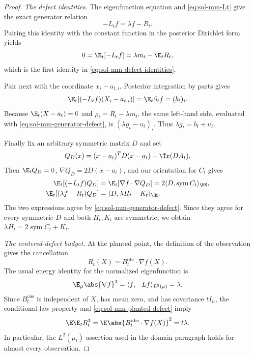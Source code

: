 \documentclass[../main.tex]{subfiles}
\begin{document}
\begin{proof}
\medskip
\noindent\emph{The defect identities.}
The eigenfunction equation and \eqref{eq:sol-mm-Lt} give the exact generator relation
\begin{equation}
  -L_tf=\lambda f-R_t.
  \label{eq:sol-mm-generator-defect}
\end{equation}
Pairing this identity with the constant function in the posterior Dirichlet form yields
\[
  0=\E_t[-L_tf]=\lambda m_t-\E_tR_t,
\]
which is the first identity in \eqref{eq:sol-mm-defect-identities}.

Pair next with the coordinate $x_i-a_{t,i}$.  Posterior integration by parts gives
\[
  \E_t[(-L_tf)(X_i-a_{t,i})]=\E_t\partial_i f=(b_t)_i.
\]
Because $\E_t(X-a_t)=0$ and $\rho_t=R_t-\lambda m_t$, the same left-hand side, evaluated with
\eqref{eq:sol-mm-generator-defect}, is $(\lambda g_t-u_t)_i$.  Thus
$\lambda g_t=b_t+u_t$.

Finally fix an arbitrary symmetric matrix $D$ and set
\[
  Q_D(x)=(x-a_t)^TD(x-a_t)-\Tr(DA_t).
\]
Then $\E_tQ_D=0$, $\nabla Q_D=2D(x-a_t)$, and our orientation for $C_t$ gives
\begin{align*}
  \E_t[(-L_tf)Q_D]
  &=\E_t[\nabla f\cdot\nabla Q_D]
    =2\langle D,\operatorname{sym}C_t\rangle_{\HS},\\
  \E_t[(\lambda f-R_t)Q_D]
  &=\langle D,\lambda H_t-K_t\rangle_{\HS}.
\end{align*}
The two expressions agree by \eqref{eq:sol-mm-generator-defect}.  Since they agree for every
symmetric $D$ and both $H_t,K_t$ are symmetric, we obtain
$\lambda H_t=2\operatorname{sym}C_t+K_t$.

\medskip
\noindent\emph{The centered-defect budget.}
At the planted point, the definition of the observation gives the cancellation
\begin{equation}
  R_t(X)=B_t^{\mathrm{obs}}\cdot\nabla f(X).
  \label{eq:sol-mm-planted-defect}
\end{equation}
The usual energy identity for the normalized eigenfunction is
\begin{equation}
  \E_\mu\abs{\nabla f}^2
  =\langle f,-Lf\rangle_{L^2(\mu)}=\lambda.
  \label{eq:sol-mm-gradient-energy}
\end{equation}
Since $B_t^{\mathrm{obs}}$ is independent of $X$, has mean zero, and has covariance $tI_n$,
the conditional-law property and \eqref{eq:sol-mm-planted-defect} imply
\begin{equation}
  \E\E_tR_t^2
  =\E\abs{B_t^{\mathrm{obs}}\cdot\nabla f(X)}^2
  =t\lambda.
  \label{eq:sol-mm-defect-second-moment}
\end{equation}
In particular, the $L^2(\mu_t)$ assertion used in the domain paragraph holds for almost every
observation.


\end{proof}
\end{document}
